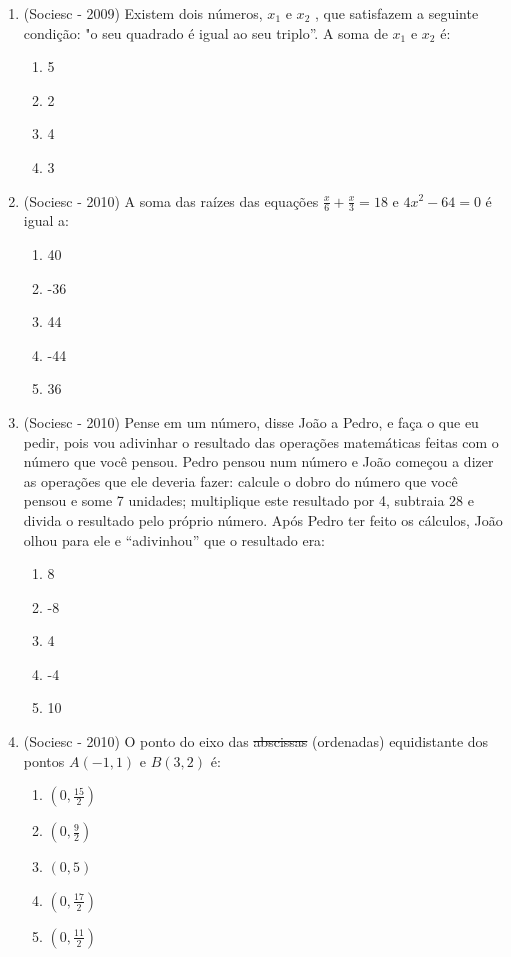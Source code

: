 \begin{enumerate}
 \item (Sociesc - 2009) Existem dois números, $x_1$ e $x_2$ , que satisfazem a seguinte condição: "o seu quadrado é igual ao seu triplo”. A soma de $x_1$ e $x_2$ é:
  \begin{enumerate}
  \item 5
  \item 2
  \item 4
  \item 3
 \end{enumerate}

 \item (Sociesc - 2010) A soma das raízes das equações $\frac{x}{6}+\frac{x}{3}=18$ e $4x^2-64=0$ é igual a:
  \begin{enumerate}
  \item 40
  \item -36
  \item 44
  \item -44
  \item 36
 \end{enumerate}

  \item (Sociesc - 2010) Pense em um número, disse João a Pedro, e faça o que eu pedir, pois vou adivinhar o resultado das operações matemáticas feitas com o número que você pensou. Pedro pensou num número e João começou a dizer as operações que ele deveria fazer: calcule o dobro do número que você pensou e some 7 unidades; multiplique este resultado por 4, subtraia 28 e divida o resultado pelo próprio número. Após Pedro ter feito os cálculos, João olhou para ele e “adivinhou” que o resultado era:
  \begin{enumerate}
  \item 8
  \item -8
  \item 4
  \item -4
  \item 10
 \end{enumerate}

 \item (Sociesc - 2010) O ponto do eixo das \sout{abscissas} (ordenadas) equidistante dos pontos $A(-1, 1)$ e $B(3, 2)$ é:


 \begin{multicols}{2}

 \begin{enumerate}
  \item $(0, \frac{15}{2})$
  \item $(0, \frac{9}{2})$
  \item $(0,5)$
  \item $(0, \frac{17}{2})$
  \item $(0, \frac{11}{2})$
 \end{enumerate}


\end{multicols}
\end{enumerate}
